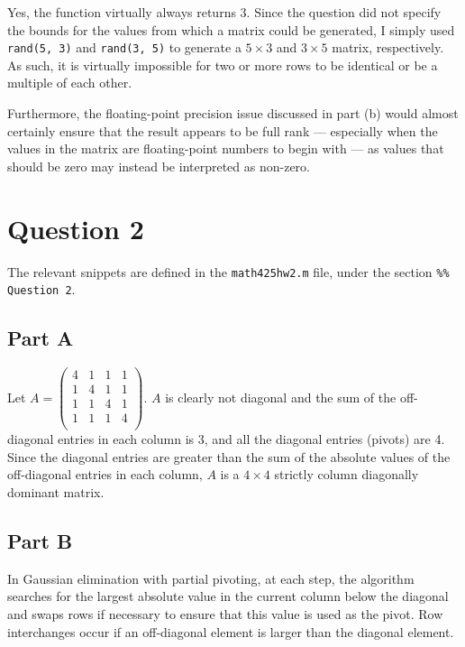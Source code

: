 \documentclass[12pt]{article}
\newcommand{\code}[1]{\texttt{#1}}
\begin{document}
Yes, the function virtually always returns 3. Since the question did not specify the bounds for the values from which a matrix could be generated, I simply used \code{rand(5, 3)} and \code{rand(3, 5)} to generate a $5\times3$ and $3\times5$ matrix, respectively. As such, it is virtually impossible for two or more rows to be identical or be a multiple of each other.

Furthermore, the floating-point precision issue discussed in part (b) would almost certainly ensure that the result appears to be full rank --- especially when the values in the matrix are floating-point numbers to begin with --- as values that should be zero may instead be interpreted as non-zero.

\section*{Question 2}

The relevant snippets are defined in the \code{math425hw2.m} file, under the section \code{\%\% Question 2}.

\subsection*{Part A}

Let $A = \begin{pmatrix}
    4 & 1 & 1 & 1 \\
    1 & 4 & 1 & 1 \\
    1 & 1 & 4 & 1 \\
    1 & 1 & 1 & 4 \\
\end{pmatrix}
$. $A$ is clearly not diagonal and the sum of the off-diagonal entries in each column is 3, and all the diagonal entries (pivots) are 4. Since the diagonal entries are greater than the sum of the absolute values of the off-diagonal entries in each column, $A$ is a $4\times4$ strictly column diagonally dominant matrix.

\subsection*{Part B}

In Gaussian elimination with partial pivoting, at each step, the algorithm searches for the largest absolute value in the current column below the diagonal and swaps rows if necessary to ensure that this value is used as the pivot. Row interchanges occur if an off-diagonal element is larger than the diagonal element.
\end{document}
